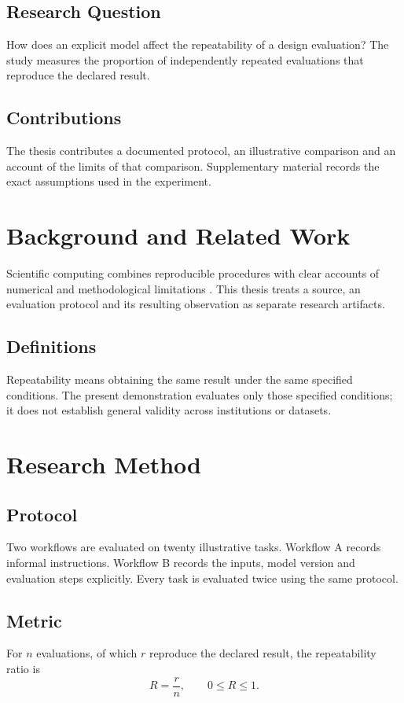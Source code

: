 \section{Research Question}
How does an explicit model affect the repeatability of a design evaluation? The study measures the proportion of independently repeated evaluations that reproduce the declared result.
\section{Contributions}
The thesis contributes a documented protocol, an illustrative comparison and an account of the limits of that comparison. Supplementary material records the exact assumptions used in the experiment.

\chapter{Background and Related Work}
Scientific computing combines reproducible procedures with clear accounts of numerical and methodological limitations \cite{wilson2014}. This thesis treats a source, an evaluation protocol and its resulting observation as separate research artifacts.
\section{Definitions}
Repeatability means obtaining the same result under the same specified conditions. The present demonstration evaluates only those specified conditions; it does not establish general validity across institutions or datasets.

\chapter{Research Method}
\label{chap:method}
\section{Protocol}
Two workflows are evaluated on twenty illustrative tasks. Workflow A records informal instructions. Workflow B records the inputs, model version and evaluation steps explicitly. Every task is evaluated twice using the same protocol.
\section{Metric}
For $n$ evaluations, of which $r$ reproduce the declared result, the repeatability ratio is
\begin{equation}
  R = \frac{r}{n}, \qquad 0 \leq R \leq 1.
\end{equation}
